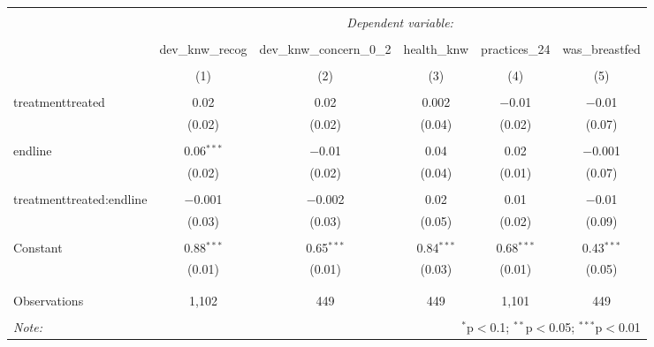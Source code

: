 
\begin{sidewaystable}[!htbp] \centering 
  \caption{} 
  \label{tbl:regression} 
\begin{tabular}{@{\extracolsep{5pt}}lccccc} 
\\[-1.8ex]\hline 
\hline \\[-1.8ex] 
 & \multicolumn{5}{c}{\textit{Dependent variable:}} \\ 
\cline{2-6} 
\\[-1.8ex] & dev\_knw\_recog & dev\_knw\_concern\_0\_2 & health\_knw & practices\_24 & was\_breastfed \\ 
\\[-1.8ex] & (1) & (2) & (3) & (4) & (5)\\ 
\hline \\[-1.8ex] 
 treatmenttreated & 0.02 & 0.02 & 0.002 & $-$0.01 & $-$0.01 \\ 
  & (0.02) & (0.02) & (0.04) & (0.02) & (0.07) \\ 
  & & & & & \\ 
 endline & 0.06$^{***}$ & $-$0.01 & 0.04 & 0.02 & $-$0.001 \\ 
  & (0.02) & (0.02) & (0.04) & (0.01) & (0.07) \\ 
  & & & & & \\ 
 treatmenttreated:endline & $-$0.001 & $-$0.002 & 0.02 & 0.01 & $-$0.01 \\ 
  & (0.03) & (0.03) & (0.05) & (0.02) & (0.09) \\ 
  & & & & & \\ 
 Constant & 0.88$^{***}$ & 0.65$^{***}$ & 0.84$^{***}$ & 0.68$^{***}$ & 0.43$^{***}$ \\ 
  & (0.01) & (0.01) & (0.03) & (0.01) & (0.05) \\ 
  & & & & & \\ 
\hline \\[-1.8ex] 
Observations & 1,102 & 449 & 449 & 1,101 & 449 \\ 
\hline 
\hline \\[-1.8ex] 
\textit{Note:}  & \multicolumn{5}{r}{$^{*}$p$<$0.1; $^{**}$p$<$0.05; $^{***}$p$<$0.01} \\ 
\end{tabular} 
\end{sidewaystable} 
